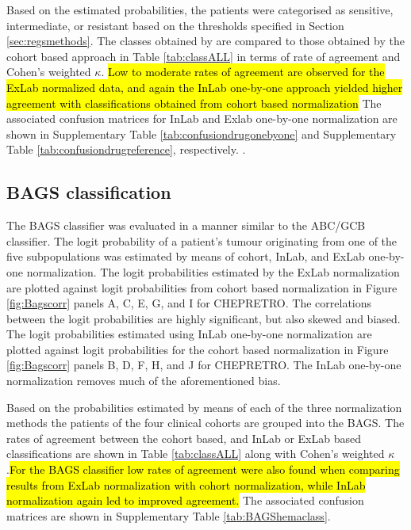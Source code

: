 \documentclass{article}
\begin{document}
Based on the estimated probabilities, the patients were categorised as sensitive, intermediate, or resistant based on the thresholds specified in Section \ref{sec:regsmethods}.
The classes obtained by \hemaClass{} are compared to those obtained by the cohort based approach in Table \ref{tab:classALL} in terms of rate of agreement and Cohen's weighted $\kappa$. \hl{Low to moderate rates of agreement are observed for the ExLab normalized data, and again the InLab one-by-one approach yielded higher agreement with classifications obtained from cohort based normalization}
The associated confusion matrices for InLab and Exlab one-by-one normalization are shown in
Supplementary Table \ref{tab:confusiondrugonebyone} and
Supplementary Table \ref{tab:confusiondrugreference}, respectively.
.


\subsection{BAGS classification}
The BAGS classifier was evaluated in a manner similar to the ABC/GCB classifier.
The logit probability of a patient's tumour originating from one of the five subpopulations was estimated by means of cohort, InLab, and ExLab one-by-one normalization.
The logit probabilities estimated by the ExLab normalization are plotted against logit probabilities from cohort based normalization in Figure \ref{fig:Bagscorr} panels A, C, E, G, and I for CHEPRETRO.
The correlations between the logit probabilities are highly significant, but also skewed and biased.
The logit probabilities estimated using InLab one-by-one normalization are plotted against logit probabilities for the cohort based normalization in Figure \ref{fig:Bagscorr} panels B, D, F, H, and J for CHEPRETRO.
The InLab one-by-one normalization removes much of the aforementioned bias.

Based on the probabilities estimated by means of each of the three normalization methods the patients of the four clinical cohorts are grouped into the BAGS.
The rates of agreement between the cohort based, and InLab or ExLab based classifications are shown in Table \ref{tab:classALL} along with Cohen's weighted $\kappa$.\hl{For the BAGS classifier low rates of agreement were also found when comparing results from ExLab normalization with cohort normalization, while InLab normalization again led to improved agreement.}
The associated confusion matrices are shown in Supplementary Table \ref{tab:BAGShemaclass}.


\end{document}
